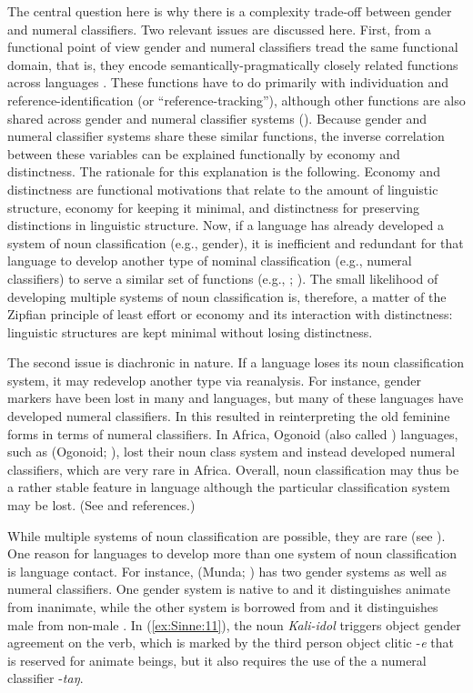 \documentclass[output=collectionpaper]{langsci/langscibook}
\begin{document}
The central question here is why there is a complexity trade-off between gender and numeral classifiers. Two relevant issues are discussed here. First, from a functional point of view gender and numeral classifiers tread the same functional domain, that is, they encode semantically-pragmatically closely related functions across languages \citep[293]{Miestamo2007}. These functions have to do primarily with individuation and reference-identification (or ``reference-tracking''), although other functions are also shared across gender and numeral classifier systems (\citealt[293--294]{Contini-Morava2013}). Because gender and numeral classifier systems share these similar functions, the inverse correlation between these variables can be explained functionally by economy and distinctness. The rationale for this explanation is the following. Economy and distinctness are functional motivations that relate to the amount of linguistic structure, economy for keeping it minimal, and distinctness for preserving distinctions in linguistic structure. Now, if a language has already developed a system of noun classification (e.g., gender), it is inefficient and redundant for that language to develop another type of nominal classification (e.g., numeral classifiers) to serve a similar set of functions (e.g., \citealt{Hawkins2004}; \citealt{Sinnemaeki2014}). The small likelihood of developing multiple systems of noun classification is, therefore, a matter of the Zipfian principle of least effort or economy and its interaction with distinctness: linguistic structures are kept minimal without losing distinctness.

The second issue is diachronic in nature. If a language loses its noun classification system, it may redevelop another type via reanalysis. For instance, gender markers have been lost in many  and  languages, but many of these languages have developed numeral classifiers. In  this resulted in reinterpreting the old feminine forms in terms of numeral classifiers. In Africa, Ogonoid (also called ) languages, such as  (Ogonoid; ), lost their noun class system and instead developed numeral classifiers, which are very rare in Africa. Overall, noun classification may thus be a rather stable feature in language although the particular classification system may be lost. (See \citealt[379--381]{Aikhenvald2000} and references.)

While multiple systems of noun classification are possible, they are rare (see ). One reason for languages to develop more than one system of noun classification is language contact. For instance,  (Munda; ) has two gender systems as well as numeral classifiers. One gender system is native to  and it distinguishes animate from inanimate, while the other system is borrowed from  and it distinguishes male from non-male \citep[39]{Ghosh2008}. In (\ref{ex:Sinne:11}), the noun \textit{Kali-idol} triggers object gender agreement on the verb, which is marked by the third person object clitic -\textit{e} that is reserved for animate beings, but it also requires the use of the a numeral classifier -\textit{taŋ}.
\end{document}
